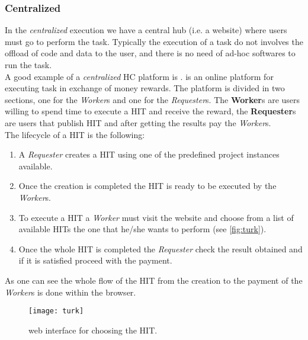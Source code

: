 \subsubsection{Centralized}
In the \emph{centralized} execution we have a central hub (i.e. a website) where
users must go to perform the task. Typically the execution of a task do not
involves the offload of code and data to the user, and there is no need of ad-hoc
softwares to run the task.\\

A good example of a \emph{centralized} \ac{HC} platform is .
 is an online platform for executing task in exchange of money
rewards. The platform is divided in two sections, one for the \emph{Worker}s and
one for the \emph{Requester}s. The \textbf{Worker}s are users willing to spend
time to execute a \ac{HIT} and receive the reward, the \textbf{Requester}s are
users that publish \ac{HIT} and after getting the results pay the \emph{Worker}s.\\

The lifecycle of a \ac{HIT} is the following:
\begin{enumerate}
    \item A \emph{Requester} creates a \ac{HIT} using one of the predefined project
    instances available.

    \item Once the creation is completed the \ac{HIT} is ready to be executed by
    the \emph{Worker}s.

    \item To execute a \ac{HIT} a \emph{Worker} must visit the 
    website and choose from a list of available \ac{HIT}s the one that he/she
    wants to perform (see \autoref{fig:turk}).

    \item Once the whole \ac{HIT} is completed the \emph{Requester} check the
    result obtained and if it is satisfied proceed with the payment.
\end{enumerate}
As one can see the whole flow of the \ac{HIT} from the creation to the payment
of the \emph{Worker}s is done within the browser.\\
\begin{figure}[htb]
    \centering
    \texttt{[image: turk]}
    \caption{ web interface for choosing the \acs{HIT}.}
    \label{fig:turk}
\end{figure}





